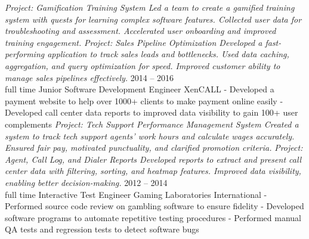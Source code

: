 \documentclass[9pt]{developercv} %
\begin{document}
\begin{entrylist}
{            \textit{Project: Gamification Training System\newline
            Led a team to create a gamified training system with quests for learning complex software features. 
            Collected user data for troubleshooting and assessment. 
            Accelerated user onboarding and improved training engagement. \newline\newline}
            \textit{Project: Sales Pipeline Optimization\newline
            Developed a fast-performing application to track sales leads and bottlenecks. 
            Used data caching, aggregation, and query optimization for speed. 
            Improved customer ability to manage sales pipelines effectively.\newline}
        }
	\entry
		{2014 -- 2016\\\footnotesize{full time}}
		{Junior Software Development Engineer}
		{XenCALL}
		{
            - Developed a payment website to help over 1000+ clients to make payment online easily\newline
            - Developed call center data reports to improved data visibility to gain 100+ user complements\newline
            \newline
            \textit{Project: Tech Support Performance Management System\newline
            Created a system to track tech support agents' work hours and calculate wages accurately. 
            Ensured fair pay, motivated punctuality, and clarified promotion criteria.
            \newline\newline}
            \textit{Project: Agent, Call Log, and Dialer Reports\newline
            Developed reports to extract and present call center data with filtering, sorting, and heatmap features. 
            Improved data visibility, enabling better decision-making.\newline}
        }
    \entry
		{2012 -- 2014\\\footnotesize{full time}}
		{Interactive Test Engineer}
		{Gaming Laboratories International}
		{
            - Performed source code review on gambling software to ensure fidelity\newline
            - Developed software programs to automate repetitive testing procedures\newline
            - Performed manual QA tests and regression tests to detect software bugs\newline
        }
\end{entrylist}
\end{document}
